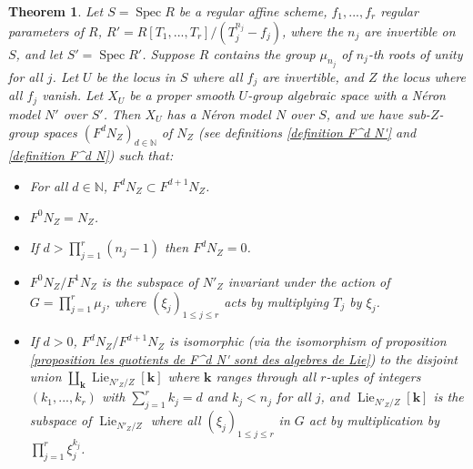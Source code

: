 \documentclass{article}
\newcommand{\N}{\mathbb{N}}
\DeclareMathOperator{\spec}{Spec}
\DeclareMathOperator{\lie}{Lie}
\newtheorem{thm}{Theorem}[section]
\theoremstyle{definition}
\theoremstyle{remark}
\newtheorem{rem}{Remark}[thm]
\begin{document}
\begin{thm}\label{theorem filtration around a point}
Let $S=\spec R$ be a regular affine scheme, $f_1,...,f_r$ regular parameters of $R$, $R'=R[T_1,...,T_r]/(T_j^{n_j}-f_j)$, where the $n_j$ are invertible on $S$, and let $S'=\spec R'$. Suppose $R$ contains the group $\mu_{n_j}$ of $n_j$-th roots of unity for all $j$. Let $U$ be the locus in $S$ where all $f_j$ are invertible, and $Z$ the locus where all $f_j$ vanish. Let $X_U$ be a proper smooth $U$-group algebraic space with a N\'eron model $N'$ over $S'$. Then $X_U$ has a N\'eron model $N$ over $S$, and we have sub-$Z$-group spaces $(F^d N_Z)_{d\in\N}$ of $N_Z$ (see definitions \ref{definition F^d N'} and \ref{definition F^d N}) such that:
\begin{itemize}
\item For all $d\in\N$, $F^d N_Z\subset F^{d+1} N_Z$.
\item $F^0 N_Z=N_Z$.
\item If $d>\prod\limits_{j=1}^r (n_j-1)$ then $F^d N_Z=0$.
\item $F^0 N_Z/F^1 N_Z$ is the subspace of $N'_Z$ invariant under the action of $G=\prod\limits_{j=1}^r \mu_j$, where $(\xi_j)_{1\leq j\leq r}$ acts by multiplying $T_j$ by $\xi_j$.
\item If $d>0$, $F^d N_Z/F^{d+1} N_Z$ is isomorphic (via the isomorphism of proposition \ref{proposition les quotients de F^d N' sont des algebres de Lie}) to the disjoint union $\coprod\limits_\mathbf{k}\lie_{N'_Z/Z}[\mathbf{k}]$ where $\mathbf{k}$ ranges through all $r$-uples of integers $(k_1,...,k_r)$ with $\sum\limits_{j=1}^r k_j=d$ and $k_j<n_j$ for all $j$, and $\lie_{N'_Z/Z}[\mathbf{k}]$ is the subspace of $\lie_{N'_Z/Z}$ where all $(\xi_j)_{1\leq j\leq r}$ in $G$ act by multiplication by $\prod\limits_{j=1}^r \xi_j^{k_j}$.
\end{itemize}
\end{thm}


\end{document}
